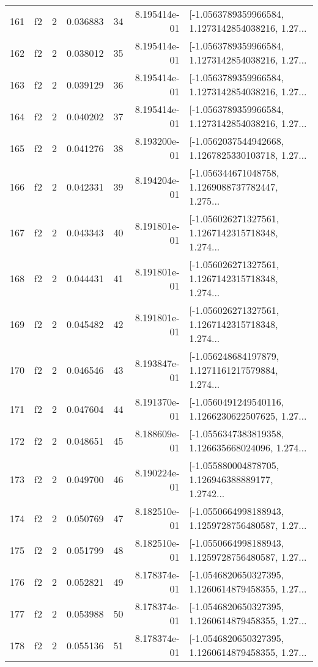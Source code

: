 \begin{tabular}{lllrlrl}
161 &  f2 &   2 &  0.036883 &   34 &  8.195414e-01 &  [-1.0563789359966584, 1.1273142854038216, 1.27... \\
162 &  f2 &   2 &  0.038012 &   35 &  8.195414e-01 &  [-1.0563789359966584, 1.1273142854038216, 1.27... \\
163 &  f2 &   2 &  0.039129 &   36 &  8.195414e-01 &  [-1.0563789359966584, 1.1273142854038216, 1.27... \\
164 &  f2 &   2 &  0.040202 &   37 &  8.195414e-01 &  [-1.0563789359966584, 1.1273142854038216, 1.27... \\
165 &  f2 &   2 &  0.041276 &   38 &  8.193200e-01 &  [-1.0562037544942668, 1.1267825330103718, 1.27... \\
166 &  f2 &   2 &  0.042331 &   39 &  8.194204e-01 &  [-1.056344671048758, 1.1269088737782447, 1.275... \\
167 &  f2 &   2 &  0.043343 &   40 &  8.191801e-01 &  [-1.056026271327561, 1.1267142315718348, 1.274... \\
168 &  f2 &   2 &  0.044431 &   41 &  8.191801e-01 &  [-1.056026271327561, 1.1267142315718348, 1.274... \\
169 &  f2 &   2 &  0.045482 &   42 &  8.191801e-01 &  [-1.056026271327561, 1.1267142315718348, 1.274... \\
170 &  f2 &   2 &  0.046546 &   43 &  8.193847e-01 &  [-1.056248684197879, 1.1271161217579884, 1.274... \\
171 &  f2 &   2 &  0.047604 &   44 &  8.191370e-01 &  [-1.0560491249540116, 1.1266230622507625, 1.27... \\
172 &  f2 &   2 &  0.048651 &   45 &  8.188609e-01 &  [-1.0556347383819358, 1.126635668024096, 1.274... \\
173 &  f2 &   2 &  0.049700 &   46 &  8.190224e-01 &  [-1.055880004878705, 1.126946388889177, 1.2742... \\
174 &  f2 &   2 &  0.050769 &   47 &  8.182510e-01 &  [-1.0550664998188943, 1.1259728756480587, 1.27... \\
175 &  f2 &   2 &  0.051799 &   48 &  8.182510e-01 &  [-1.0550664998188943, 1.1259728756480587, 1.27... \\
176 &  f2 &   2 &  0.052821 &   49 &  8.178374e-01 &  [-1.0546820650327395, 1.1260614879458355, 1.27... \\
177 &  f2 &   2 &  0.053988 &   50 &  8.178374e-01 &  [-1.0546820650327395, 1.1260614879458355, 1.27... \\
178 &  f2 &   2 &  0.055136 &   51 &  8.178374e-01 &  [-1.0546820650327395, 1.1260614879458355, 1.27... \\

\end{tabular}
